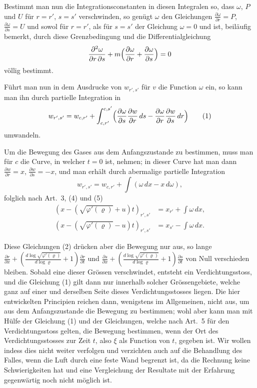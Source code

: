 \documentclass[12pt,a4paper]{article}
\begin{document}
Bestimmt man nun die Integrationsconstanten in diesen Integralen so, dass $\omega$, $P$ und $U$ f\"ur $r = r'$, $s = s'$ verschwinden, so gen\"ugt $\omega$ den Gleichungen $\frac{\partial\omega}{\partial r} = P$, $\frac{\partial\omega}{\partial s} = U$ und sowol f\"ur $r = r'$, als f\"ur $s = s'$ der Gleichung $\omega = 0$ und ist, beil\"aufig bemerkt, durch diese Grenzbedingung und die Differentialgleichung
\[
\frac{\partial^{2}\omega}{\partial r\,\partial s} + m\Bigl(\frac{\partial\omega}{\partial r} + \frac{\partial\omega}{\partial s}\Bigr) = 0
\]
v\"ollig bestimmt.

F\"uhrt man nun in dem Ausdrucke von $w_{r',s'}$ f\"ur $v$ die Function $\omega$ ein, so kann man ihn durch partielle Integration in
\begin{equation*}
w_{r',s'} = w_{c,r'} + \int_{c,r'}^{c,s'}\Bigl(\frac{\partial\omega}{\partial s}\frac{\partial w}{\partial r}\,ds - \frac{\partial\omega}{\partial r}\frac{\partial w}{\partial s}\,dr\Bigr)\tag{1}
\end{equation*}
umwandeln.

Um die Bewegung des Gases aus dem Anfangszustande zu bestimmen, muss man f\"ur $c$ die Curve, in welcher $t = 0$ ist, nehmen; in dieser Curve hat man dann $\frac{\partial w}{\partial r} = x$, $\frac{\partial w}{\partial s} = -x$, und man erh\"alt durch abermalige partielle Integration
\[
w_{r',s'} = w_{c,r'} + \int(\omega\,dx - x\,d\omega),
\]
folglich nach Art.~3, (4) und (5)
\begin{align*}
(x - (\sqrt{\varphi'(\varrho)} + u)t)_{r',s'} &= x_{r'} + \int\omega\,dx,\\
(x - (\sqrt{\varphi'(\varrho)} - u)t)_{r',s'} &= x_{s'} - \int\omega\,dx.\tag{2}
\end{align*}

Diese Gleichungen (2) dr\"ucken aber die Bewegung nur aus, so lange $\frac{\partial r}{\partial x} + (\frac{d\log\sqrt{\varphi'(\varrho)}}{d\log\varrho} + 1)\frac{\partial r}{\partial t}$ und $\frac{\partial s}{\partial x} + (\frac{d\log\sqrt{\varphi'(\varrho)}}{d\log\varrho} + 1)\frac{\partial s}{\partial t}$ von Null verschieden bleiben. Sobald eine dieser Gr\"ossen verschwindet, entsteht ein Verdichtungsstoss, und die Gleichung (1) gilt dann nur innerhalb solcher Gr\"ossengebiete, welche ganz auf einer und derselben Seite dieses Verdichtungsstosses liegen. Die hier entwickelten Principien reichen dann, wenigstens im Allgemeinen, nicht aus, um aus dem Anfangszustande die Bewegung zu bestimmen; wohl aber kann man mit H\"ulfe der Gleichung (1) und der Gleichungen, welche nach Art.~5 f\"ur den Verdichtungsstoss gelten, die Bewegung bestimmen, wenn der Ort des Verdichtungsstosses zur Zeit $t$, also $\xi$ als Function von $t$, gegeben ist. Wir wollen indess dies nicht weiter verfolgen und verzichten auch auf die Behandlung des Falles, wenn die Luft durch eine feste Wand begrenzt ist, da die Rechnung keine Schwierigkeiten hat und eine Vergleichung der Resultate mit der Erfahrung gegenw\"artig noch nicht m\"oglich ist.
\end{document}
